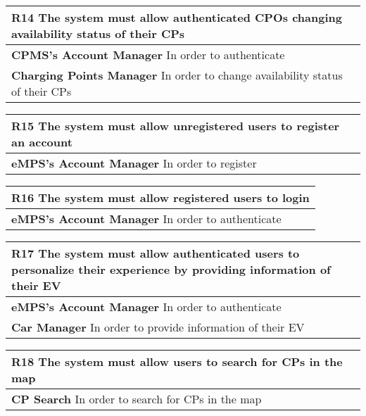 \begin{table}[H]
    \begin{tabularx}{\textwidth}{X}
        \toprule
        \textbf{R14} The system must allow authenticated CPOs changing availability status of
        their CPs                \\ \midrule
        \textbf{CPMS's Account Manager} In order to authenticate\\                                                                                       
        \textbf{Charging Points Manager} In order to change availability status of their CPs\\
    \end{tabularx}
\end{table}
\begin{table}[H]
    \begin{tabularx}{\textwidth}{X}
        \toprule
        \textbf{R15} The system must allow unregistered users to register an account                \\ \midrule
        \textbf{eMPS's Account Manager} In order to register\\      
    \end{tabularx}
\end{table}
\begin{table}[H]
    \begin{tabularx}{\textwidth}{X}
        \toprule
        \textbf{R16} The system must allow registered users to login                \\ \midrule
        \textbf{eMPS's Account Manager} In order to authenticate\\      
    \end{tabularx}
\end{table}
\begin{table}[H]
    \begin{tabularx}{\textwidth}{X}
        \toprule
        \textbf{R17} The system must allow authenticated users to personalize their experience by
        providing information of their EV                \\ \midrule
        \textbf{eMPS's Account Manager} In order to authenticate\\                                                                                      
        \textbf{Car Manager} In order to provide information of their EV\\ 
    \end{tabularx}
\end{table}
\begin{table}[H]
    \begin{tabularx}{\textwidth}{X}
        \toprule
        \textbf{R18} The system must allow users to search for CPs in the map                \\ \midrule
        \textbf{CP Search} In order to search for CPs in the map\\ 
    \end{tabularx}
\end{table}
